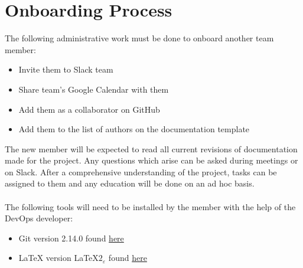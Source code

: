 \documentclass[11pt]{article}
\begin{document}
\section{Onboarding Process}
The following administrative work must be done to onboard another team member:
\begin{itemize}
\item Invite them to Slack team
\item Share team's Google Calendar with them
\item Add them as a collaborator on GitHub
\item Add them to the list of authors on the documentation template
\end{itemize}
The new member will be expected to read all current revisions of documentation made for the project. Any questions which arise can be asked during meetings or on Slack. After a comprehensive understanding of the project, tasks can be assigned to them and any education will be done on an ad hoc basis. \\\\
The following tools will need to be installed by the member with the help of the DevOps developer:
\begin{itemize}
\item Git version 2.14.0 found \href{https://git-scm.com}{here}
\item LaTeX version \LaTeX  $2_\varepsilon$ found \href{https://www.latex-project.org/get/}{here}
\end{itemize}
\end{document}
